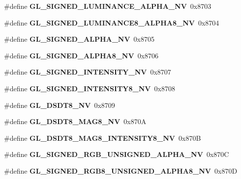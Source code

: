 \begin{DoxyCompactItemize}
\item 
\#define {\bfseries G\+L\+\_\+\+S\+I\+G\+N\+E\+D\+\_\+\+L\+U\+M\+I\+N\+A\+N\+C\+E\+\_\+\+A\+L\+P\+H\+A\+\_\+\+N\+V}~0x8703\label{_s_d_l__opengl_8h_a58a01897ff7550e06335686b8fe0e048}

\item 
\#define {\bfseries G\+L\+\_\+\+S\+I\+G\+N\+E\+D\+\_\+\+L\+U\+M\+I\+N\+A\+N\+C\+E8\+\_\+\+A\+L\+P\+H\+A8\+\_\+\+N\+V}~0x8704\label{_s_d_l__opengl_8h_ac3db198753d3a9d475e0ec8c41136aa9}

\item 
\#define {\bfseries G\+L\+\_\+\+S\+I\+G\+N\+E\+D\+\_\+\+A\+L\+P\+H\+A\+\_\+\+N\+V}~0x8705\label{_s_d_l__opengl_8h_a9e8015b884e1998dbfb8411cf53237a3}

\item 
\#define {\bfseries G\+L\+\_\+\+S\+I\+G\+N\+E\+D\+\_\+\+A\+L\+P\+H\+A8\+\_\+\+N\+V}~0x8706\label{_s_d_l__opengl_8h_a462f348c0cf5cf8dca9113de68b4af6c}

\item 
\#define {\bfseries G\+L\+\_\+\+S\+I\+G\+N\+E\+D\+\_\+\+I\+N\+T\+E\+N\+S\+I\+T\+Y\+\_\+\+N\+V}~0x8707\label{_s_d_l__opengl_8h_ad66c6571291ca80c02d3b6e6488efa4b}

\item 
\#define {\bfseries G\+L\+\_\+\+S\+I\+G\+N\+E\+D\+\_\+\+I\+N\+T\+E\+N\+S\+I\+T\+Y8\+\_\+\+N\+V}~0x8708\label{_s_d_l__opengl_8h_a7d3f0f40a1a6203735c2ca78122e8545}

\item 
\#define {\bfseries G\+L\+\_\+\+D\+S\+D\+T8\+\_\+\+N\+V}~0x8709\label{_s_d_l__opengl_8h_a3fc9d88d55fca111f7d2b443f4ae2702}

\item 
\#define {\bfseries G\+L\+\_\+\+D\+S\+D\+T8\+\_\+\+M\+A\+G8\+\_\+\+N\+V}~0x870\+A\label{_s_d_l__opengl_8h_a8a702902dd0ad591aa31579384bff614}

\item 
\#define {\bfseries G\+L\+\_\+\+D\+S\+D\+T8\+\_\+\+M\+A\+G8\+\_\+\+I\+N\+T\+E\+N\+S\+I\+T\+Y8\+\_\+\+N\+V}~0x870\+B\label{_s_d_l__opengl_8h_ad49f0d31410ec1255ae6940dd6902c95}

\item 
\#define {\bfseries G\+L\+\_\+\+S\+I\+G\+N\+E\+D\+\_\+\+R\+G\+B\+\_\+\+U\+N\+S\+I\+G\+N\+E\+D\+\_\+\+A\+L\+P\+H\+A\+\_\+\+N\+V}~0x870\+C\label{_s_d_l__opengl_8h_a007f37f93fe4b54ae4d4510f6da69be0}

\item 
\#define {\bfseries G\+L\+\_\+\+S\+I\+G\+N\+E\+D\+\_\+\+R\+G\+B8\+\_\+\+U\+N\+S\+I\+G\+N\+E\+D\+\_\+\+A\+L\+P\+H\+A8\+\_\+\+N\+V}~0x870\+D\label{_s_d_l__opengl_8h_a0d199ffe01ff6f5b1aa15e911a325a42}


\end{DoxyCompactItemize}
